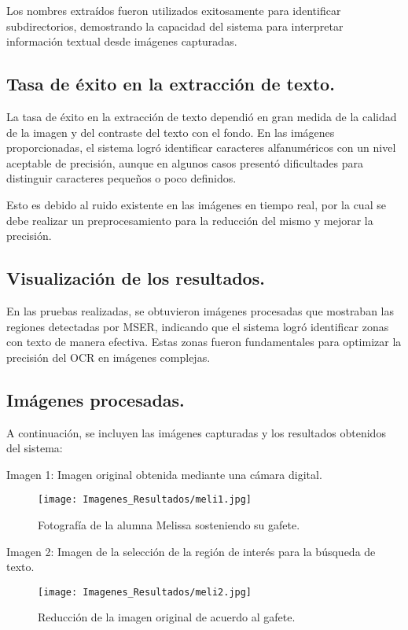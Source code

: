 \documentclass[12pt, letterpaper]{article}
\begin{document}
Los nombres extraídos fueron utilizados exitosamente para identificar subdirectorios, demostrando la capacidad del sistema para interpretar información textual desde imágenes capturadas.

\subsection{Tasa de éxito en la extracción de texto.}
La tasa de éxito en la extracción de texto dependió en gran medida de la calidad de la imagen y del contraste del texto con el fondo. En las imágenes proporcionadas, el sistema logró identificar caracteres alfanuméricos con un nivel aceptable de precisión, aunque en algunos casos presentó dificultades para distinguir caracteres pequeños o poco definidos.

Esto es debido al ruido existente en las imágenes en tiempo real, por la cual se debe realizar un preprocesamiento para la reducción del mismo y mejorar la precisión.

\subsection{Visualización de los resultados.}
En las pruebas realizadas, se obtuvieron imágenes procesadas que mostraban las regiones detectadas por MSER, indicando que el sistema logró identificar zonas con texto de manera efectiva. Estas zonas fueron fundamentales para optimizar la precisión del OCR en imágenes complejas.

\subsection{Imágenes procesadas.}
A continuación, se incluyen las imágenes capturadas y los resultados obtenidos del sistema:


Imagen 1: Imagen original obtenida mediante una cámara digital.
\begin{figure}[H]
    \centering
    \texttt{[image: Imagenes\_Resultados/meli1.jpg]} %
    \caption{Fotografía de la alumna Melissa sosteniendo su gafete.}
    \label{fig:etiqueta}
\end{figure}

Imagen 2: Imagen de la selección de la región de interés para la búsqueda de texto.
\begin{figure}[H]
    \centering
    \texttt{[image: Imagenes\_Resultados/meli2.jpg]} %
    \caption{Reducción de la imagen original de acuerdo al gafete.}
    \label{fig:etiqueta}
\end{figure}
\end{document}

